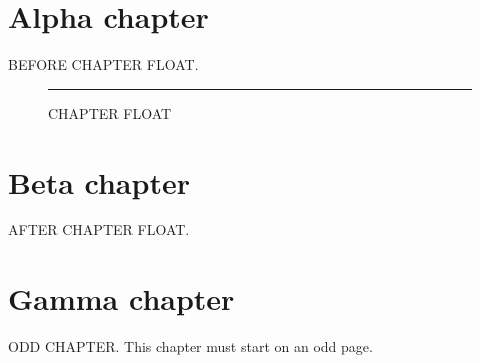 \documentclass[fontset=fandol,degree-level=doctor]{hithesis}
\begin{document}
\chapter{Alpha chapter}
BEFORE CHAPTER FLOAT.
\begin{figure}[p]\centering\rule{80mm}{30mm}\caption{CHAPTER FLOAT}\end{figure}
\chapter{Beta chapter}
AFTER CHAPTER FLOAT.
\chapter{Gamma chapter}
ODD CHAPTER. This chapter must start on an odd page.
\end{document}
